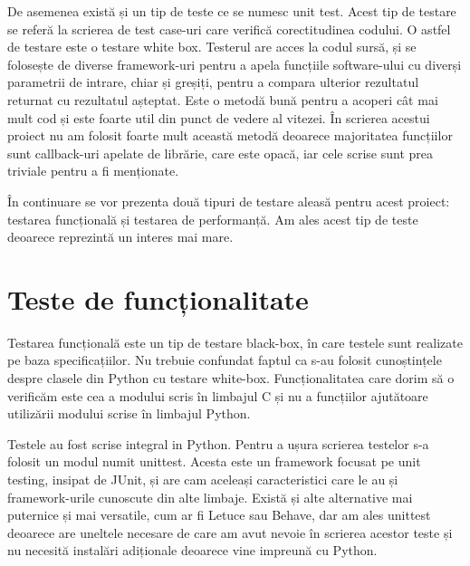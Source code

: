 De asemenea există și un tip de teste ce se numesc unit test. Acest tip de testare se referă la scrierea de test case-uri care verifică corectitudinea codului. O astfel de testare este o testare white box. Testerul are acces la codul sursă, și se folosește de diverse framework-uri pentru a apela funcțiile software-ului cu diverși parametrii de intrare, chiar și greșiți, pentru a compara ulterior rezultatul returnat cu rezultatul așteptat. Este o metodă bună pentru a acoperi cât mai mult cod și este foarte util din punct de vedere al vitezei. În scrierea acestui proiect nu am folosit foarte mult această metodă deoarece majoritatea funcțiilor sunt callback-uri apelate de librărie, care este opacă, iar cele scrise sunt prea triviale pentru a fi menționate.

În continuare se vor prezenta două tipuri de testare aleasă pentru acest proiect: testarea funcțională și testarea de performanță. Am ales acest tip de teste deoarece reprezintă un interes mai mare.

\section{Teste de funcționalitate}
Testarea funcțională este un tip de testare black-box, în care testele sunt realizate pe baza specificațiilor. Nu trebuie confundat faptul ca s-au folosit cunoștințele despre clasele din Python cu testare white-box. Funcționalitatea care dorim să o verificăm este cea a modului scris în limbajul C și nu a funcțiilor ajutătoare utilizării modului scrise în limbajul Python.

Testele au fost scrise integral in Python. Pentru a ușura scrierea testelor s-a folosit un modul numit unittest. Acesta este un framework focusat pe unit testing, insipat de JUnit, și are cam aceleași caracteristici care le au și framework-urile cunoscute din alte limbaje. Există și alte alternative mai puternice și mai versatile, cum ar fi Letuce sau Behave, dar am ales unittest deoarece are uneltele necesare de care am avut nevoie în scrierea acestor teste și nu necesită instalări adiționale deoarece vine impreună cu Python. 

